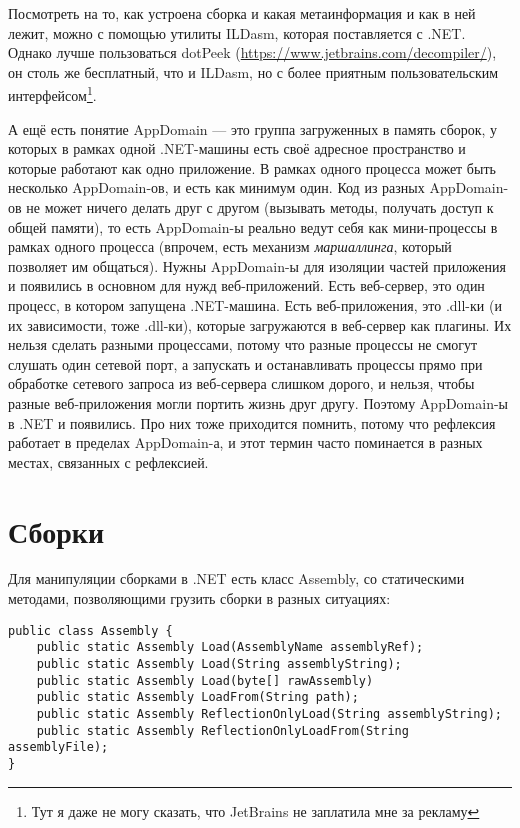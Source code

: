 \documentclass{../../text-style}
\begin{document}
Посмотреть на то, как устроена сборка и какая метаинформация и как в ней лежит, можно с помощью утилиты ILDasm, которая поставляется с .NET. Однако лучше пользоваться dotPeek (\url{https://www.jetbrains.com/decompiler/}), он столь же бесплатный, что и ILDasm, но с более приятным пользовательским интерфейсом\footnote{Тут я даже не могу сказать, что JetBrains не заплатила мне за рекламу}.

А ещё есть понятие AppDomain --- это группа загруженных в память сборок, у которых в рамках одной .NET-машины есть своё адресное пространство и которые работают как одно приложение. В рамках одного процесса может быть несколько AppDomain-ов, и есть как минимум один. Код из разных AppDomain-ов не может ничего делать друг с другом (вызывать методы, получать доступ к общей памяти), то есть AppDomain-ы реально ведут себя как мини-процессы в рамках одного процесса (впрочем, есть механизм \textit{маршаллинга}, который позволяет им общаться). Нужны AppDomain-ы для изоляции частей приложения и появились в основном для нужд веб-приложений. Есть веб-сервер, это один процесс, в котором запущена .NET-машина. Есть веб-приложения, это .dll-ки (и их зависимости, тоже .dll-ки), которые загружаются в веб-сервер как плагины. Их нельзя сделать разными процессами, потому что разные процессы не смогут слушать один сетевой порт, а запускать и останавливать процессы прямо при обработке сетевого запроса из веб-сервера слишком дорого, и нельзя, чтобы разные веб-приложения могли портить жизнь друг другу. Поэтому AppDomain-ы в .NET и появились. Про них тоже приходится помнить, потому что рефлексия работает в пределах AppDomain-а, и этот термин часто поминается в разных местах, связанных с рефлексией.

\section{Сборки}

Для манипуляции сборками в .NET есть класс Assembly, со статическими методами, позволяющими грузить сборки в разных ситуациях:

\begin{verbatim}
public class Assembly {
    public static Assembly Load(AssemblyName assemblyRef);
    public static Assembly Load(String assemblyString);
    public static Assembly Load(byte[] rawAssembly)
    public static Assembly LoadFrom(String path);
    public static Assembly ReflectionOnlyLoad(String assemblyString);
    public static Assembly ReflectionOnlyLoadFrom(String assemblyFile);
}
\end{verbatim}
\end{document}
